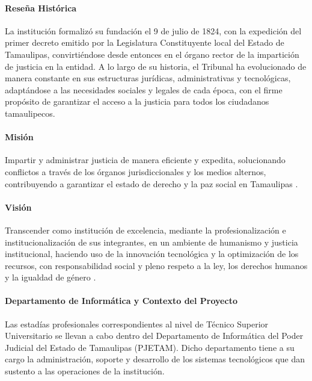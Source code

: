 \paragraph{Reseña Histórica}
\label{par:reseña_antecedentes_empresa}
La institución formalizó su fundación el 9 de julio de 1824, con la expedición del primer decreto emitido por la Legislatura Constituyente local del Estado de Tamaulipas, convirtiéndose desde entonces en el órgano rector de la impartición de justicia en la entidad. A lo largo de su historia, el Tribunal ha evolucionado de manera constante en sus estructuras jurídicas, administrativas y tecnológicas, adaptándose a las necesidades sociales y legales de cada época, con el firme propósito de garantizar el acceso a la justicia para todos los ciudadanos tamaulipecos.

\paragraph{Misión}
\label{par:mision_antecedentes_empresa}
Impartir y administrar justicia de manera eficiente y expedita, solucionando conflictos a través de los órganos jurisdiccionales y los medios alternos, contribuyendo a garantizar el estado de derecho y la paz social en Tamaulipas \cite{pjetam2024mision}.

\paragraph{Visión}
\label{par:vision_antecedentes_empresa}
Transcender como institución de excelencia, mediante la profesionalización e institucionalización de sus integrantes, en un ambiente de humanismo y justicia institucional, haciendo uso de la innovación tecnológica y la optimización de los recursos, con responsabilidad social y pleno respeto a la ley, los derechos humanos y la igualdad de género \cite{pjetam2024mision}.

\paragraph{Departamento de Informática y Contexto del Proyecto}
\label{par:proyecto_antecedentes_empresa}
Las estadías profesionales correspondientes al nivel de Técnico Superior Universitario se llevan a cabo dentro del Departamento de Informática del Poder Judicial del Estado de Tamaulipas (PJETAM). Dicho departamento tiene a su cargo la administración, soporte y desarrollo de los sistemas tecnológicos que dan sustento a las operaciones de la institución.

